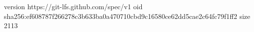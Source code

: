 version https://git-lfs.github.com/spec/v1
oid sha256:ef608787f266278c3b633ba0a470710cbd9c16580ce62dd5cae2c64fc79f1ff2
size 2113
